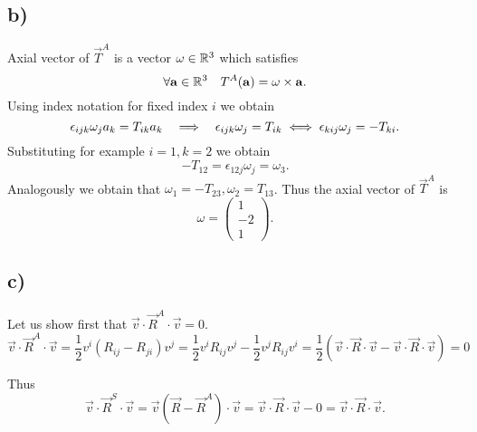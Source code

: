 \documentclass[10pt]{article}
\begin{document}
    \subsection*{b)}
    Axial vector of $\vec T^A$ is a vector $\omega\in \mathbb{R}^3$ which satisfies
    \begin{displaymath}
      \forall \mathbf{a} \in \mathbb{R}^3 \quad T^A (\mathbf{a}) = \omega \times \mathbf{a}.
    \end{displaymath}
    Using index notation for fixed index $i$ we obtain
    \begin{displaymath}
      \epsilon_{ijk} \omega_j a_k = T_{ik} a_k \quad \Longrightarrow \quad \epsilon_{ijk} \omega_j = T_{ik} \iff \epsilon_{kij}\omega_j = -T_{ki}.
    \end{displaymath}
    Substituting for example $i = 1, k = 2$ we obtain
    \begin{displaymath}
      - T_{12} = \epsilon_{12j}\omega_j = \omega_3.
    \end{displaymath}
    Analogously we obtain that $\omega_1 = - T_{23}, \omega_2 = T_{13}$.
    Thus the axial vector of $\vec T^A$ is 
    \begin{displaymath}
      \omega = \begin{pmatrix}
        1 \\
        - 2 \\
        1
      \end{pmatrix}.
    \end{displaymath}
    
    
    
    

    \subsection*{c)}
    Let us show first that $\vec v \cdot \vec R^A \cdot \vec v = 0$.
    \begin{displaymath}
      \vec v \cdot \vec R^A \cdot \vec v = \frac{1}{2}v^i (R_{ij} - R_{ji}) v^j 
      = \frac{1}{2} v^i R_{ij} v^j - \frac{1}{2} v^j R_{ij} v^i 
      = \frac{1}{2} (\vec v \cdot \vec R \cdot \vec v - \vec v \cdot \vec R \cdot \vec v) = 0
    \end{displaymath}

    Thus
    \begin{displaymath}
      \vec v \cdot \vec R^S \cdot \vec v = \vec v (\vec R - \vec R^A) \cdot \vec v 
      = \vec v \cdot \vec R\cdot \vec v - 0  = \vec v \cdot \vec R\cdot \vec v.
    \end{displaymath}
    
    
    
\end{document}

